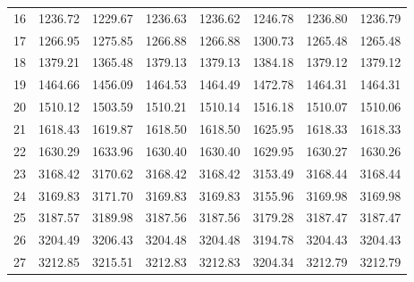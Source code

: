 \documentclass[10pt,oneside]{article}
\begin{document}
\begin{table}[h!]
\begin{tabular}{cccccccc}
16 &   1236.72 & 1229.67 & 1236.63 & 1236.62 &      1246.78 & 1236.80 & 1236.79 \\
17 &   1266.95 & 1275.85 & 1266.88 & 1266.88 &      1300.73 & 1265.48 & 1265.48 \\
18 &   1379.21 & 1365.48 & 1379.13 & 1379.13 &      1384.18 & 1379.12 & 1379.12 \\
19 &   1464.66 & 1456.09 & 1464.53 & 1464.49 &      1472.78 & 1464.31 & 1464.31 \\
20 &   1510.12 & 1503.59 & 1510.21 & 1510.14 &      1516.18 & 1510.07 & 1510.06 \\
21 &   1618.43 & 1619.87 & 1618.50 & 1618.50 &      1625.95 & 1618.33 & 1618.33 \\
22 &   1630.29 & 1633.96 & 1630.40 & 1630.40 &      1629.95 & 1630.27 & 1630.26 \\
23 &   3168.42 & 3170.62 & 3168.42 & 3168.42 &      3153.49 & 3168.44 & 3168.44 \\
24 &   3169.83 & 3171.70 & 3169.83 & 3169.83 &      3155.96 & 3169.98 & 3169.98 \\
25 &   3187.57 & 3189.98 & 3187.56 & 3187.56 &      3179.28 & 3187.47 & 3187.47 \\
26 &   3204.49 & 3206.43 & 3204.48 & 3204.48 &      3194.78 & 3204.43 & 3204.43 \\
27 &   3212.85 & 3215.51 & 3212.83 & 3212.83 &      3204.34 & 3212.79 & 3212.79 \\
\bottomrule
\end{tabular}
\end{table}

\clearpage
\end{document}
